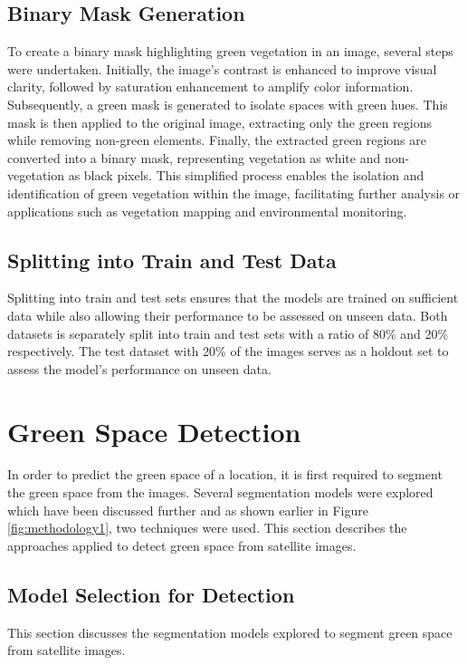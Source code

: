 \subsection{Binary Mask Generation}
To create a binary mask highlighting green vegetation in an image, several steps were undertaken. Initially, the image's contrast is enhanced to improve visual clarity, followed by saturation enhancement to amplify color information. Subsequently, a green mask is generated to isolate spaces with green hues. This mask is then applied to the original image, extracting only the green regions while removing non-green elements. Finally, the extracted green regions are converted into a binary mask, representing vegetation as white and non-vegetation as black pixels. This simplified process enables the isolation and identification of green vegetation within the image, facilitating further analysis or applications such as vegetation mapping and environmental monitoring.

\subsection{Splitting into Train and Test Data}
Splitting into train and test sets ensures that the models are trained on sufficient data while also allowing their performance to be assessed on unseen data.
Both datasets is separately split into train and test sets with a ratio of 80\% and 20\% respectively. The test dataset with 20\% of the images serves as a holdout set to assess the model's performance on unseen data.
\section{Green Space Detection} 
In order to predict the green space of a location, it is first required to segment the green space from the images. Several segmentation models were explored which have been discussed further and as shown earlier in Figure \ref{fig:methodology1}, two techniques were used.
This section describes the approaches applied to detect green space from satellite images. 
\subsection{Model Selection for Detection }
This section discusses the segmentation models explored to segment green space from satellite images. 
